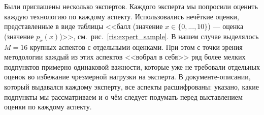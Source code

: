 Были приглашены несколько экспертов. Каждого эксперта мы попросили оценить каждую технологию по каждому аспекту. Использовались нечёткие оценки, представленные в виде таблицы <<балл (значение $x \in \{0, ..., 10\}$) --- оценка (значение $p_{\tilde x}(x)$)>>, см.~рис.~\ref{ris:expert_sample}. В нашем случае выделялось $M = 16$ крупных аспектов с отдельными оценками. При этом с точки зрения методологии каждый из этих аспектов <<вобрал в себя>> ряд более мелких подпунктов примерно одинаковой важности, которые уже не требовали отдельных оценок во избежание чрезмерной нагрузки на эксперта. В документе-описании, который выдавался каждому эксперту, все аспекты расшифрованы: указано, какие подпункты мы рассматриваем и о чём следует  подумать перед выставлением оценки по каждому аспекту.

